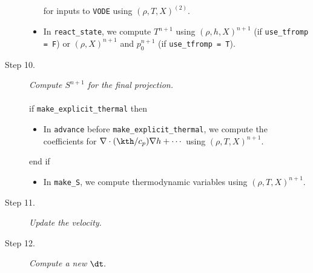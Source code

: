 \begin{description}
\begin{itemize}
for inputs to {\tt VODE} using $(\rho,T,X)^{(2)}$.
\item In {\tt react\_state}, we compute $T^{n+1}$ using $(\rho,h,X)^{n+1}$ 
(if {\tt use\_tfromp = F}) or $(\rho,X)^{n+1}$ and $p_0^{n+1}$ (if {\tt use\_tfromp = T}).
\end{itemize}
\item[Step 10.] {\em Compute $S^{n+1}$ for the final projection.}\\ \\
if {\tt make\_explicit\_thermal} then
\begin{itemize}
\item In {\tt advance} before {\tt make\_explicit\_thermal}, we compute the coefficients for 
$\nabla\cdot(\kth/c_p)\nabla h + \cdots$ using $(\rho,T,X)^{n+1}$.
\end{itemize}
end if
\begin{itemize}
\item In {\tt make\_S}, we compute thermodynamic variables using $(\rho,T,X)^{n+1}$.
\end{itemize}
\item[Step 11.] {\em Update the velocity.}
\item[Step 12.] {\em Compute a new $\dt.$}
\end{description}

